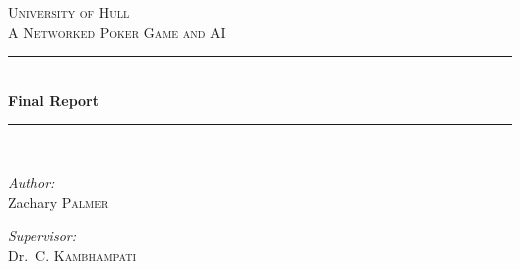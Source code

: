 \begin{titlepage}

\newcommand{\HRule}{\rule{\linewidth}{0.5mm}} %

\center{} %
 

\textsc{\LARGE University of Hull}\\[1.5cm] %
\textsc{\Large A Networked Poker Game and AI}\\[0.5cm] %


\HRule\\[0.4cm]
{\huge \bfseries Final Report}\\[0.4cm] %
\HRule\\[1.5cm]
 

\begin{minipage}{0.4\textwidth}
\begin{flushleft} \large
\emph{Author:}\\
Zachary \textsc{Palmer} %
\end{flushleft}
\end{minipage}
\begin{minipage}{0.4\textwidth}
\begin{flushright} \large
\emph{Supervisor:} \\
Dr.\ C. \textsc{Kambhampati} %
\end{flushright}
\end{minipage}\\[2cm]


\end{titlepage}
